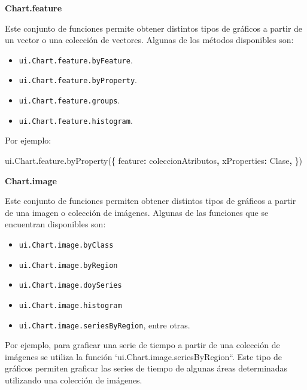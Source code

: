 \documentclass[
  12pt,
  letterpaper,
  twoside]{book}
\newenvironment{Shaded}{\begin{snugshade}}{\end{snugshade}}
\newcommand{\AttributeTok}[1]{\textcolor[rgb]{0.77,0.63,0.00}{#1}}
\newcommand{\DataTypeTok}[1]{\textcolor[rgb]{0.13,0.29,0.53}{#1}}
\newcommand{\FunctionTok}[1]{\textcolor[rgb]{0.00,0.00,0.00}{#1}}
\newcommand{\NormalTok}[1]{#1}
\newcommand{\OperatorTok}[1]{\textcolor[rgb]{0.81,0.36,0.00}{\textbf{#1}}}
\newcommand{\StringTok}[1]{\textcolor[rgb]{0.31,0.60,0.02}{#1}}
\providecommand{\tightlist}{%
  \setlength{\itemsep}{0pt}\setlength{\parskip}{0pt}}
\begin{document}
\textbf{Chart.feature}

Este conjunto de funciones permite obtener distintos tipos de gráficos a partir de un vector o una colección de vectores. Algunas de los métodos disponibles son:

\begin{itemize}
\tightlist
\item
  \texttt{ui.Chart.feature.byFeature}.
\item
  \texttt{ui.Chart.feature.byProperty}.
\item
  \texttt{ui.Chart.feature.groups}.
\item
  \texttt{ui.Chart.feature.histogram}.
\end{itemize}

Por ejemplo:

\begin{Shaded}
\begin{Highlighting}[]
\NormalTok{ui}\OperatorTok{.}\AttributeTok{Chart}\OperatorTok{.}\AttributeTok{feature}\OperatorTok{.}\FunctionTok{byProperty}\NormalTok{(\{}
  \DataTypeTok{feature}\OperatorTok{:}\NormalTok{ coleccionAtributos}\OperatorTok{,} 
  \DataTypeTok{xProperties}\OperatorTok{:} \StringTok{\textquotesingle{}Clase\textquotesingle{}}\OperatorTok{,}
\NormalTok{\})}
\end{Highlighting}
\end{Shaded}

\textbf{Chart.image}

Este conjunto de funciones permiten obtener distintos tipos de gráficos a partir de una imagen o colección de imágenes. Algunas de las funciones que se encuentran disponibles son:

\begin{itemize}
\tightlist
\item
  \texttt{ui.Chart.image.byClass}
\item
  \texttt{ui.Chart.image.byRegion}
\item
  \texttt{ui.Chart.image.doySeries}
\item
  \texttt{ui.Chart.image.histogram}
\item
  \texttt{ui.Chart.image.seriesByRegion}, entre otras.
\end{itemize}

Por ejemplo, para graficar una serie de tiempo a partir de una colección de imágenes se utiliza la función `ui.Chart.image.seriesByRegion``. Este tipo de gráficos permiten graficar las series de tiempo de algunas áreas determinadas utilizando una colección de imágenes.
\end{document}
